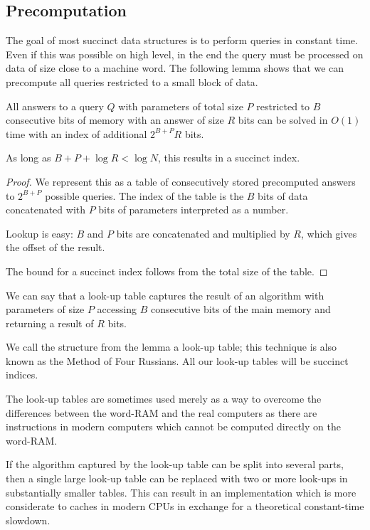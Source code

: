 \subsection{Precomputation}

The goal of most succinct data structures is to perform queries in constant time.
Even if this was possible on high level, in the end the query must be processed on data of size close to a machine word.
The following lemma shows that we can precompute all queries restricted to a small block of data.

\begin{lemma}
	All answers to a query $Q$ with parameters of total size $P$ restricted to $B$ consecutive bits of memory with an answer of size $R$ bits can be solved in $O(1)$ time with an index of additional $2^{B+P} R$ bits.
	
	As long as $B + P + \log R < \log N$, this results in a succinct index.
\end{lemma}
\begin{proof}
	We represent this as a table of consecutively stored precomputed answers to $2^{B+P}$ possible queries.
	The index of the table is the $B$ bits of data concatenated with $P$ bits of parameters interpreted as a number.

	Lookup is easy: $B$ and $P$ bits are concatenated and multiplied by $R$, which gives the offset of the result.
	
	The bound for a succinct index follows from the total size of the table.
\end{proof}

We can say that a look-up table captures the result of an algorithm with parameters of size $P$ accessing $B$ consecutive bits of the main memory and returning a result of $R$ bits.

We call the structure from the lemma a look-up table; this technique is also known as the Method of Four Russians.
All our look-up tables will be succinct indices.

\bigbreak

The look-up tables are sometimes used merely as a way to overcome the differences between the word-RAM and the real computers as there are instructions in modern computers which cannot be computed directly on the word-RAM.

If the algorithm captured by the look-up table can be split into several parts, then a single large look-up table can be replaced with two or more look-ups in substantially smaller tables.
This can result in an implementation which is more considerate to caches in modern CPUs in exchange for a theoretical constant-time slowdown.

